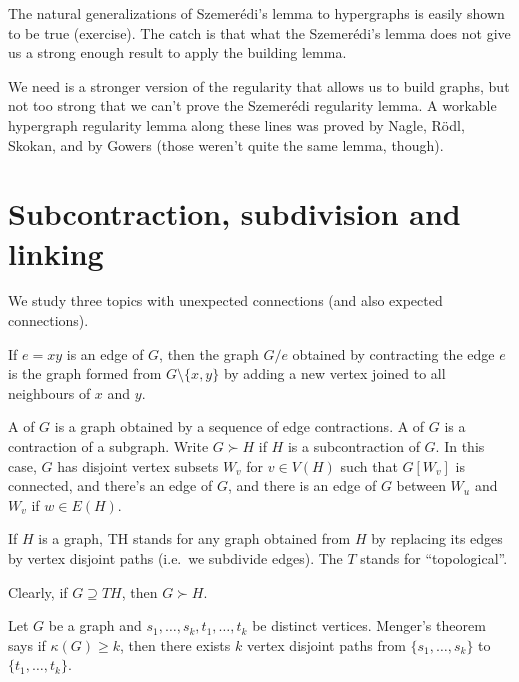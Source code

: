 \documentclass[a4paper]{article}
\begin{document}
The natural generalizations of Szemer\'edi's lemma to hypergraphs is easily shown to be true (exercise). The catch is that what the Szemer\'edi's lemma does not give us a strong enough result to apply the building lemma.

We need is a stronger version of the regularity that allows us to build graphs, but not too strong that we can't prove the Szemer\'edi regularity lemma. A workable hypergraph regularity lemma along these lines was proved by Nagle, R\"odl, Skokan, and by Gowers (those weren't quite the same lemma, though).

\section{Subcontraction, subdivision and linking}
We study three topics with unexpected connections (and also expected connections).

If $e = xy$ is an edge of $G$, then the graph $G/e$ obtained by contracting the edge $e$ is the graph formed from $G \setminus \{x, y\}$ by adding a new vertex joined to all neighbours of $x$ and $y$.


A  of $G$ is a graph obtained by a sequence of edge contractions. A  of $G$ is a contraction of a subgraph. Write $G \succ H$ if $H$ is a subcontraction of $G$. In this case, $G$ has disjoint vertex subsets $W_v$ for $v \in V(H)$ such that $G[W_v]$ is connected, and there's an edge of $G$, and there is an edge of $G$ between $W_u$ and $W_v$ if $w \in E(H)$.

If $H$ is a graph, TH stands for any graph obtained from $H$ by replacing its edges by vertex disjoint paths (i.e.\ we subdivide edges). The $T$ stands for ``topological''.

Clearly, if $G \supseteq TH$, then $G \succ H$.

\begin{center}
\end{center}
Let $G$ be a graph and $s_1, \ldots, s_k, t_1, \ldots, t_k$ be distinct vertices. Menger's theorem says if $\kappa(G) \geq k$, then there exists $k$ vertex disjoint paths from $\{s_1, \ldots, s_k\}$ to $\{t_1, \ldots, t_k\}$.
\end{document}
